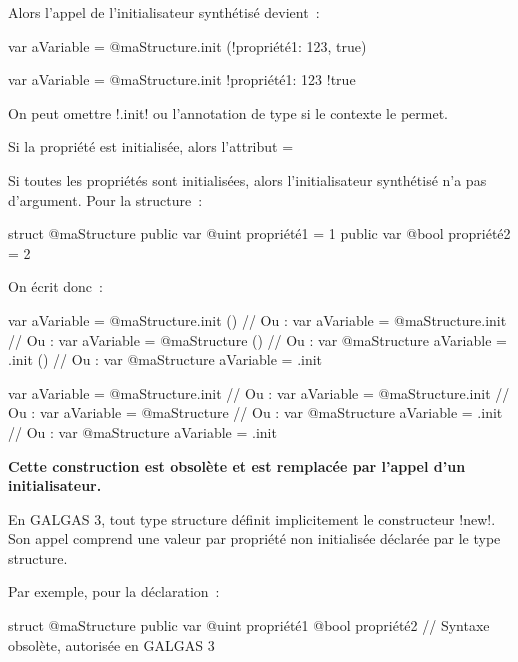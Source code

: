 Alors l'appel de l'initialisateur synthétisé devient~:
\begin{galgas4}
var aVariable = @maStructure.init (!propriété1: 123, true)
\end{galgas4}
\begin{galgas3}
var aVariable = @maStructure.init {!propriété1: 123 !true}
\end{galgas3}

On peut omettre \ggst!.init! ou l'annotation de type si le contexte le permet.

Si la propriété est initialisée, alors l'attribut \ggst=%


Si toutes les propriétés sont initialisées, alors l'initialisateur synthétisé n'a pas d'argument. Pour la structure~:
\begin{galgas34}
struct @maStructure {
  public var @uint propriété1 = 1
  public var @bool propriété2 = 2
}
\end{galgas34}

On écrit donc~:
\begin{galgas4}
var aVariable = @maStructure.init ()
// Ou :
var aVariable = @maStructure.init
// Ou :
var aVariable = @maStructure ()
// Ou :
var @maStructure aVariable = .init ()
// Ou :
var @maStructure aVariable = .init
\end{galgas4}
\begin{galgas3}
var aVariable = @maStructure.init {}
// Ou :
var aVariable = @maStructure.init
// Ou :
var aVariable = @maStructure {}
// Ou :
var @maStructure aVariable = .init {}
// Ou :
var @maStructure aVariable = .init
\end{galgas3}











{\bf Cette construction est obsolète et est remplacée par l'appel d'un initialisateur.}

En GALGAS 3, tout type structure définit implicitement le constructeur \ggst!new!. Son appel comprend une valeur par propriété non initialisée déclarée par le type structure.

Par exemple, pour la déclaration~:
\begin{galgas3}
struct @maStructure {
  public var @uint propriété1
  @bool propriété2 // Syntaxe obsolète, autorisée en GALGAS 3
}
\end{galgas3}

